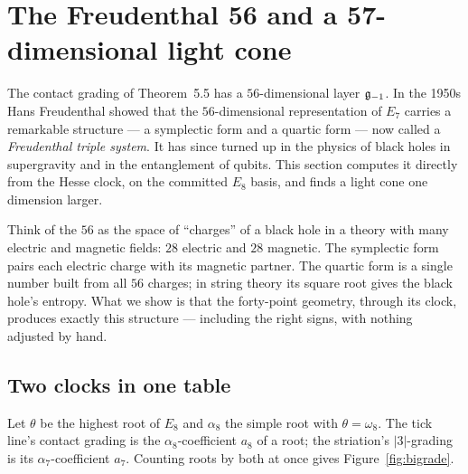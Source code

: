 \section{The Freudenthal 56 and a 57-dimensional light cone}
\label{sec:fts}

The contact grading of Theorem~5.5 has a $56$-dimensional layer $\mathfrak{g}_{-1}$. In the 1950s
Hans Freudenthal showed \cite{Freudenthal} that the $56$-dimensional representation of $E_7$ carries a
remarkable structure --- a symplectic form and a quartic form --- now called a
\emph{Freudenthal triple system}. It has since turned up in the physics of black holes in
supergravity and in the entanglement of qubits. This section computes it directly from the
Hesse clock, on the committed $E_8$ basis, and finds a light cone one dimension larger.

\begin{plainwords}
Think of the $56$ as the space of ``charges'' of a black hole in a theory with many
electric and magnetic fields: $28$ electric and $28$ magnetic. The symplectic form pairs
each electric charge with its magnetic partner. The quartic form is a single number built
from all $56$ charges; in string theory its square root gives the black hole's entropy.
What we show is that the forty-point geometry, through its clock, produces exactly this
structure --- including the right signs, with nothing adjusted by hand.
\end{plainwords}

\subsection{Two clocks in one table}

Let $\theta$ be the highest root of $E_8$ and $\alpha_8$ the simple root with
$\theta=\omega_8$. The tick line's contact grading is the $\alpha_8$-coefficient $a_8$ of
a root; the striation's $|3|$-grading is its $\alpha_7$-coefficient $a_7$. Counting
roots by both at once gives Figure~\ref{fig:bigrade}.

